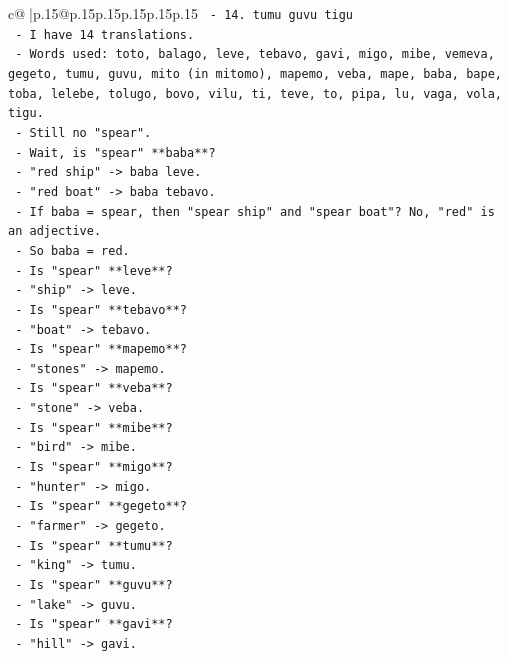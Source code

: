 \documentclass{article}
\begin{document}
{\begin{supertabular}{c@{$\;$}|p{.15\linewidth}@{}p{.15\linewidth}p{.15\linewidth}p{.15\linewidth}p{.15\linewidth}p{.15\linewidth}}
{{{\texttt{    {-} 14. tumu guvu tigu} \\
\texttt{    {-} I have 14 translations.} \\
\texttt{    {-} Words used: toto, balago, leve, tebavo, gavi, migo, mibe, vemeva, gegeto, tumu, guvu, mito (in mitomo), mapemo, veba, mape, baba, bape, toba, lelebe, tolugo, bovo, vilu, ti, teve, to, pipa, lu, vaga, vola, tigu.} \\
\texttt{    {-} Still no "spear".} \\
\texttt{    {-} Wait, is "spear" **baba**?} \\
\texttt{      {-} "red ship" {-}> baba leve.} \\
\texttt{      {-} "red boat" {-}> baba tebavo.} \\
\texttt{      {-} If baba = spear, then "spear ship" and "spear boat"? No, "red" is an adjective.} \\
\texttt{      {-} So baba = red.} \\
\texttt{    {-} Is "spear" **leve**?} \\
\texttt{      {-} "ship" {-}> leve.} \\
\texttt{    {-} Is "spear" **tebavo**?} \\
\texttt{      {-} "boat" {-}> tebavo.} \\
\texttt{    {-} Is "spear" **mapemo**?} \\
\texttt{      {-} "stones" {-}> mapemo.} \\
\texttt{    {-} Is "spear" **veba**?} \\
\texttt{      {-} "stone" {-}> veba.} \\
\texttt{    {-} Is "spear" **mibe**?} \\
\texttt{      {-} "bird" {-}> mibe.} \\
\texttt{    {-} Is "spear" **migo**?} \\
\texttt{      {-} "hunter" {-}> migo.} \\
\texttt{    {-} Is "spear" **gegeto**?} \\
\texttt{      {-} "farmer" {-}> gegeto.} \\
\texttt{    {-} Is "spear" **tumu**?} \\
\texttt{      {-} "king" {-}> tumu.} \\
\texttt{    {-} Is "spear" **guvu**?} \\
\texttt{      {-} "lake" {-}> guvu.} \\
\texttt{    {-} Is "spear" **gavi**?} \\
\texttt{      {-} "hill" {-}> gavi.} \\
}}}
\end{supertabular}}
\end{document}
